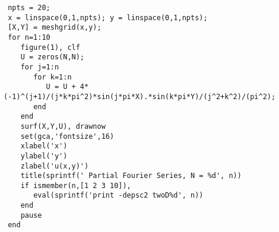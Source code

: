 {\footnotesize\begin{verbatim}
 npts = 20;
 x = linspace(0,1,npts); y = linspace(0,1,npts);
 [X,Y] = meshgrid(x,y);
 for n=1:10
    figure(1), clf
    U = zeros(N,N);
    for j=1:n
       for k=1:n
          U = U + 4*(-1)^(j+1)/(j*k*pi^2)*sin(j*pi*X).*sin(k*pi*Y)/(j^2+k^2)/(pi^2);
       end
    end
    surf(X,Y,U), drawnow
    set(gca,'fontsize',16)
    xlabel('x')
    ylabel('y')
    zlabel('u(x,y)')
    title(sprintf(' Partial Fourier Series, N = %d', n))
    if ismember(n,[1 2 3 10]), 
       eval(sprintf('print -depsc2 twoD%d', n))
    end
    pause
 end
\end{verbatim}}
